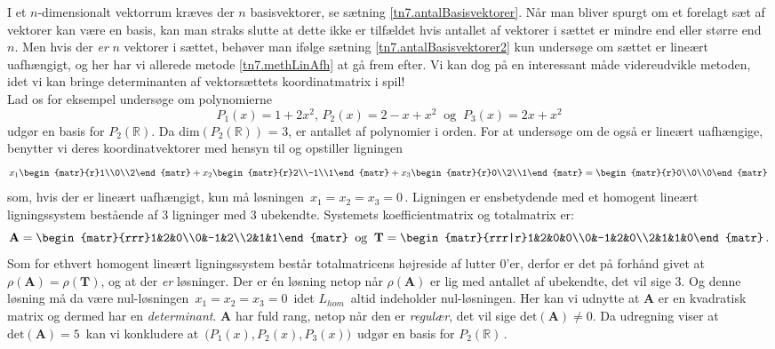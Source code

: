 I et $n$-dimensionalt vektorrum kræves der $n$ basisvektorer, se sætning \ref{tn7.antalBasisvektorer}. Når man bliver spurgt om et forelagt sæt af vektorer kan være en basis, kan man straks slutte at dette ikke er tilfældet hvis antallet af vektorer i sættet er mindre end eller større end $n$. Men hvis der \textit{er} $n$ vektorer i sættet, behøver man ifølge sætning \ref{tn7.antalBasisvektorer2} kun undersøge om sættet er lineært uafhængigt, og her har vi allerede metode \ref{tn7.methLinAfh} at gå frem efter. Vi kan dog på en interessant måde videreudvikle metoden, idet vi kan bringe determinanten af vektorsættets koordinatmatrix i spil!
\medskip\\
Lad os for eksempel undersøge om polynomierne 
$$P_1(x)=1+2x^2,\,P_2(x)=2-x+x^2\;\;\mathrm{og}\;\; P_3(x)=2x+x^2$$
udgør en basis for $P_2(\mathbb R)$. Da dim$(P_2(\mathbb R))$ = 3, er antallet af polynomier i orden. For at undersøge om de også er lineært uafhængige, benytter vi deres koordinatvektorer med hensyn til  og opstiller ligningen
$$
x_1\begin{matr}{r}1\\0\\2\end{matr}+
x_2\begin{matr}{r}2\\-1\\1\end{matr}+
x_3\begin{matr}{r}0\\2\\1\end{matr}=
\begin{matr}{r}0\\0\\0\end{matr}\,
$$
som, hvis der er lineært uafhængigt,  kun må løsningen $\,x_1=x_2=x_3=0\,$. Ligningen er ensbetydende med et homogent lineært ligningssystem bestående af 3 ligninger med 3 ubekendte. Systemets koefficientmatrix og totalmatrix er:
$$
\mathbf A=
\begin{matr}{rrr}1&2&0\\0&-1&2\\2&1&1\end{matr}
\;\;\mathrm{og}\;\;
\mathbf T=
\begin{matr}{rrr|r}1&2&0&0\\0&-1&2&0\\2&1&1&0\end{matr}\,.
$$
Som for ethvert homogent lineært ligningssystem består totalmatricens højreside af lutter $0$'er, derfor er det på forhånd givet at $\rho(\mathbf A)=\rho(\mathbf T)$, og at der \textit{er} løsninger. Der er én løsning netop når $\rho(\mathbf A)$ er lig med antallet af ubekendte, det vil sige 3. Og denne løsning må da være nul-løsningen $\,x_1=x_2=x_3=0\,$ idet $L_{hom}\,$ altid indeholder nul-løsningen. \bs
Her kan vi udnytte at $\mathbf A$ er en kvadratisk matrix og dermed har en \textit{determinant}. $\mathbf A$ har fuld rang, netop når den er \textit{regulær}, det vil sige $\mathrm{det}(\mathbf A)\neq0$.\bs
Da udregning viser at $\mathrm{det}(\mathbf A)=5\,$ kan vi konkludere at $\,\big(P_1(x),P_2(x),P_3(x)\big)\,$ udgør en basis for $P_2(\mathbb R)\,$.

